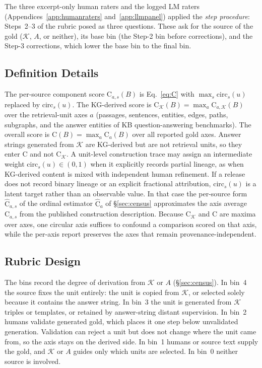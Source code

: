 \documentclass[11pt]{article}
\newcommand{\C}{\mathrm{C}}
\newcommand{\Chat}{\widehat{\mathrm{C}}}
\newcommand{\kg}{\mathcal{K}}
\newcommand{\bench}{B}
\begin{document}
\noindent The three excerpt-only human raters and the logged LM raters (Appendices~\ref{app:humanraters} and~\ref{app:llmpanel}) applied the \emph{step procedure}: Steps~2--3 of the rubric posed as three questions. These ask for the source of the gold ($\kg$, $A$, or neither), its base bin (the Step-2 bin before corrections), and the Step-3 corrections, which lower the base bin to the final bin.

\subsection{Definition Details}
\label{app:defdetails}
The per-source component score $\C_{a,s}(\bench)$ is Eq.~\eqref{eq:C} with $\max_{s}\mathrm{circ}_{s}(u)$ replaced by $\mathrm{circ}_{s}(u)$. The KG-derived score is $\C_{\kg}(\bench)=\max_{a}\C_{a,\kg}(\bench)$ over the retrieval-unit axes $a$ (passages, sentences, entities, edges, paths, subgraphs, and the answer entities of KB question-answering benchmarks). The overall score is $\C(\bench)=\max_{a}\C_a(\bench)$ over all reported gold axes. Answer strings generated from $\kg$ are KG-derived but are not retrieval units, so they enter $\C$ and not $\C_{\kg}$. A unit-level construction trace may assign an intermediate weight $\mathrm{circ}_{s}(u)\in(0,1)$ when it explicitly records partial lineage, as when KG-derived content is mixed with independent human refinement. If a release does not record binary lineage or an explicit fractional attribution, $\mathrm{circ}_{s}(u)$ is a latent target rather than an observable value. In that case the per-source form $\Chat_{a,s}$ of the ordinal estimator $\Chat_a$ of \S\ref{sec:census} approximates the axis average $\C_{a,s}$ from the published construction description. Because $\C_{\kg}$ and $\C$ are maxima over axes, one circular axis suffices to confound a comparison scored on that axis, while the per-axis report preserves the axes that remain provenance-independent.

\subsection{Rubric Design}
\label{app:rubricdesign}
The bins record the degree of derivation from $\kg$ or $A$ (\S\ref{sec:census}). In bin~4 the source fixes the unit entirely: the unit is copied from $\kg$, or selected solely because it contains the answer string. In bin~3 the unit is generated from $\kg$ triples or templates, or retained by answer-string distant supervision. In bin~2 humans validate generated gold, which places it one step below unvalidated generation. Validation can reject a unit but does not change where the unit came from, so the axis stays on the derived side. In bin~1 humans or source text supply the gold, and $\kg$ or $A$ guides only which units are selected. In bin~0 neither source is involved.
\end{document}
